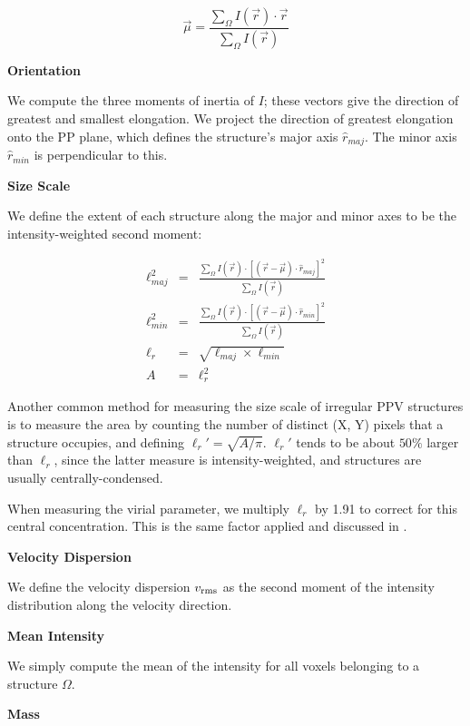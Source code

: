 {\begin{equation}
\vec{\mu} = \frac{\sum_\Omega{I(\vec{r}) \cdot \vec{r}}}{\sum_\Omega{I(\vec{r})}}
\end{equation}

\textbf{Orientation}

We compute the three moments of inertia of $I$; these vectors give the direction of
greatest and smallest elongation. We project the direction of greatest
elongation onto the PP plane, which defines the structure's major
axis $\hat{r}_{maj}$. The minor axis $\hat{r}_{min}$ is perpendicular to this.

\textbf{Size Scale}

We define the extent of each structure along the major and
minor axes to be the intensity-weighted second moment:

\begin{eqnarray}
\ell_{maj}^2 &=& \frac{\sum_{\Omega}{I(\vec{r}) \cdot \left[(\vec{r} - \vec{\mu}) \cdot \hat{r}_{maj}\right]^2}}{ \sum_\Omega{I(\vec{r})}} \\
\ell_{min}^2 &=& \frac{\sum_{\Omega}{I (\vec{r}) \cdot \left[(\vec{r} - \vec{\mu}) \cdot \hat{r}_{min}\right]^2}}{ \sum_\Omega{I(\vec{r})}} \\
\ell_r &=& \sqrt{\ell_{maj} \times \ell_{min}} \\
A &=& \ell_r^2
\end{eqnarray}

Another common method for measuring the size scale of irregular PPV structures is to measure the area by counting the
number of distinct (X, Y) pixels that a structure occupies, and defining $\ell_r' = \sqrt{A/\pi}$. $\ell_r'$ tends to be about $50\%$
larger than $\ell_r$, since the latter measure is intensity-weighted, and structures are usually centrally-condensed.

When measuring the virial parameter, we multiply $\ell_r$ by 1.91 to correct for this central concentration. This is the same factor
applied and discussed in \cite{http://adsabs.harvard.edu/abs/2008ApJ...679.1338R}.

\textbf{Velocity Dispersion}

We define the velocity dispersion $v_{\rm rms}$ as the second moment of the intensity distribution along the velocity direction.

\textbf{Mean Intensity}

  We simply compute the mean of the intensity for all voxels belonging to a structure $\Omega$.

 \textbf{Mass}

}
